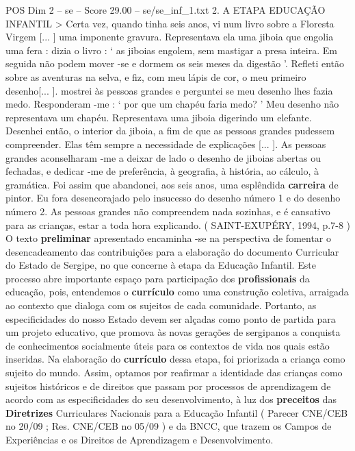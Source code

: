 \begin{textsample}{POS Dim 2 – se – Score 29.00 – se/se\_inf\_1.txt}  \label{ex:f2_pos_023}
2.
A ETAPA EDUCAÇÃO INFANTIL > Certa vez, quando tinha seis anos, vi num livro sobre a Floresta Virgem [... ] uma imponente gravura.
Representava ela uma jiboia que engolia uma fera : dizia o livro : ‘ as jiboias engolem, sem mastigar a presa inteira.
Em seguida não podem mover -se e dormem os seis meses da digestão ’.
Refleti então sobre as aventuras na selva, e fiz, com meu lápis de cor, o meu primeiro desenho[... ]. mostrei às pessoas grandes e perguntei se meu desenho lhes fazia medo.
Responderam -me : ‘ por que um chapéu faria medo? ’ Meu desenho não representava um chapéu.
Representava uma jiboia digerindo um elefante.
Desenhei então, o interior da jiboia, a fim de que as pessoas grandes pudessem compreender.
Elas têm sempre a necessidade de explicações [... ].
As pessoas grandes aconselharam -me a deixar de lado o desenho de jiboias abertas ou fechadas, e dedicar -me de preferência, à geografia, à história, ao cálculo, à gramática.
Foi assim que abandonei, aos seis anos, uma esplêndida \textbf{carreira} de pintor.
Eu fora desencorajado pelo insucesso do desenho número 1 e do desenho número 2.
As pessoas grandes não compreendem nada sozinhas, e é cansativo para as crianças, estar a toda hora explicando. ( SAINT-EXUPÉRY, 1994, p.7-8 ) O texto \textbf{preliminar} apresentado encaminha -se na perspectiva de fomentar o desencadeamento das contribuições para a elaboração do documento Curricular do Estado de Sergipe, no que concerne à etapa da Educação Infantil.
Este processo abre importante espaço para participação dos \textbf{profissionais} da educação, pois, entendemos o \textbf{currículo} como uma construção coletiva, arraigada ao contexto que dialoga com os sujeitos de cada comunidade.
Portanto, as especificidades do nosso Estado devem ser alçadas como ponto de partida para um projeto educativo, que promova às novas gerações de sergipanos a conquista de conhecimentos socialmente úteis para os contextos de vida nos quais estão inseridas.
Na elaboração do \textbf{currículo} dessa etapa, foi priorizada a criança como sujeito do mundo.
Assim, optamos por reafirmar a identidade das crianças como sujeitos históricos e de direitos que passam por processos de aprendizagem de acordo com as especificidades do seu desenvolvimento, à luz dos \textbf{preceitos} das \textbf{Diretrizes} Curriculares Nacionais para a Educação Infantil ( Parecer CNE/CEB no 20/09 ; Res.
CNE/CEB no 05/09 ) e da BNCC, que trazem os Campos de Experiências e os Direitos de Aprendizagem e Desenvolvimento.

\end{textsample}
